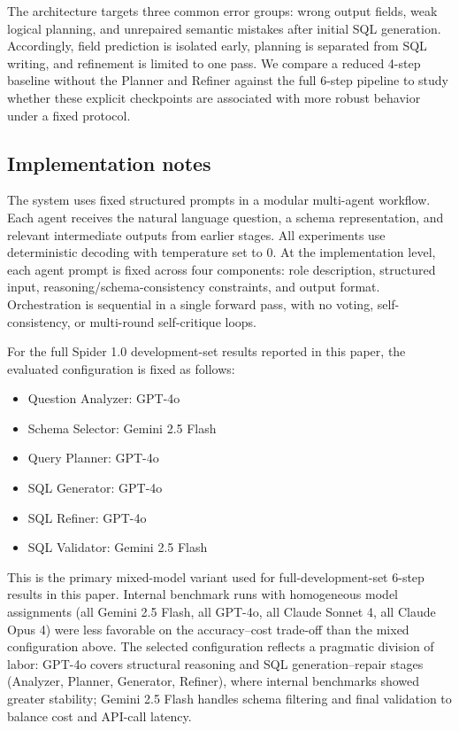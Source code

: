 The architecture targets three common error groups: wrong output fields, weak logical planning, and unrepaired semantic mistakes after initial SQL generation. Accordingly, field prediction is isolated early, planning is separated from SQL writing, and refinement is limited to one pass. We compare a reduced 4-step baseline without the Planner and Refiner against the full 6-step pipeline to study whether these explicit checkpoints are associated with more robust behavior under a fixed protocol.

\subsection{Implementation notes}\label{subsec:impl}

The system uses fixed structured prompts in a modular multi-agent workflow. Each agent receives the natural language question, a schema representation, and relevant intermediate outputs from earlier stages. All experiments use deterministic decoding with temperature set to 0. At the implementation level, each agent prompt is fixed across four components: role description, structured input, reasoning/schema-consistency constraints, and output format. Orchestration is sequential in a single forward pass, with no voting, self-consistency, or multi-round self-critique loops.

For the full Spider 1.0 development-set results reported in this paper, the evaluated configuration is fixed as follows:
\begin{itemize}
  \item Question Analyzer: GPT-4o
  \item Schema Selector: Gemini 2.5 Flash
  \item Query Planner: GPT-4o
  \item SQL Generator: GPT-4o
  \item SQL Refiner: GPT-4o
  \item SQL Validator: Gemini 2.5 Flash
\end{itemize}

This is the primary mixed-model variant used for full-development-set 6-step results in this paper. Internal benchmark runs with homogeneous model assignments (all Gemini 2.5 Flash, all GPT-4o, all Claude Sonnet 4, all Claude Opus 4) were less favorable on the accuracy--cost trade-off than the mixed configuration above. The selected configuration reflects a pragmatic division of labor: GPT-4o covers structural reasoning and SQL generation--repair stages (Analyzer, Planner, Generator, Refiner), where internal benchmarks showed greater stability; Gemini 2.5 Flash handles schema filtering and final validation to balance cost and API-call latency.

